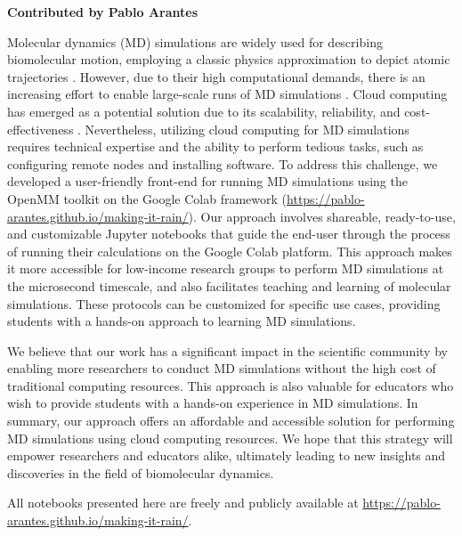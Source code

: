 \textbf{Contributed by Pablo Arantes}

Molecular dynamics (MD) simulations are widely used for describing biomolecular motion, employing a classic physics approximation to depict atomic trajectories \cite{Liu2017,Hollingsworth2018}. However, due to their high computational demands, there is an increasing effort to enable large-scale runs of MD simulations \cite{Hollingsworth2018}. Cloud computing has emerged as a potential solution due to its scalability, reliability, and cost-effectiveness \cite{Ebejer2013}. Nevertheless, utilizing cloud computing for MD simulations requires technical expertise and the ability to perform tedious tasks, such as configuring remote nodes and installing software. To address this challenge, we developed a user-friendly front-end for running MD simulations \cite{Arantes2021} using the OpenMM toolkit \cite{Eastman2017} on the Google Colab framework \cite{colab,Bisong2019} (\url{https://pablo-arantes.github.io/making-it-rain/}). Our approach involves shareable, ready-to-use, and customizable Jupyter notebooks that guide the end-user through the process of running their calculations on the Google Colab platform. This approach makes it more accessible for low-income research groups to perform MD simulations at the microsecond timescale, and also facilitates teaching and learning of molecular simulations. These protocols can be customized for specific use cases, providing students with a hands-on approach to learning MD simulations.

We believe that our work has a significant impact in the scientific community by enabling more researchers to conduct MD simulations without the high cost of traditional computing resources. This approach is also valuable for educators who wish to provide students with a hands-on experience in MD simulations. In summary, our approach offers an affordable and accessible solution for performing MD simulations using cloud computing resources. We hope that this strategy will empower researchers and educators alike, ultimately leading to new insights and discoveries in the field of biomolecular dynamics.

All notebooks presented here are freely and publicly available at  \url{https://pablo-arantes.github.io/making-it-rain/}.